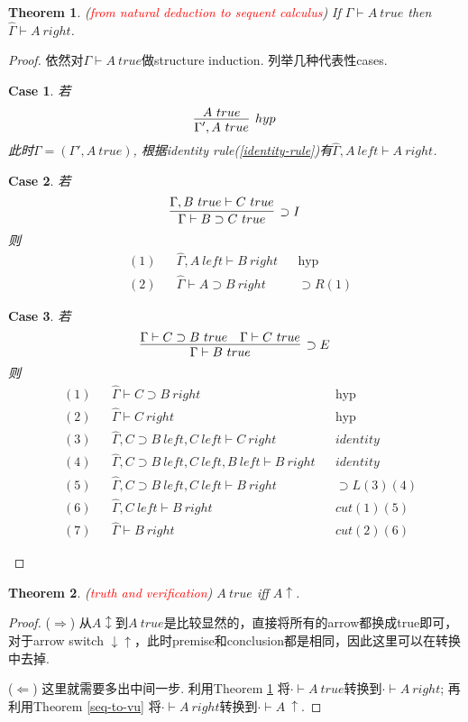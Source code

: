 \documentclass{article}
\theoremstyle{plain}
\newtheorem{theorem}{Theorem}
\newtheorem{case}{Case}
\theoremstyle{nonumberplain}
\newtheorem{proof}{Proof}
\newcommand{\redt}[1]{\textcolor{red}{#1}}
\begin{document}
\begin{theorem}\label{nd-to-seq}
\rm (\redt{from natural deduction to sequent calculus}) If $\Gamma \vdash A~true$ then $\widehat{\Gamma} \vdash A~right$.
\end{theorem}

\begin{proof}
\rm 依然对$\Gamma \vdash A~true$做structure induction. 列举几种代表性cases.
\begin{case}若
$$
\infer[hyp]{\Gamma', A~true}{A~true}
$$
此时$\Gamma = (\Gamma', A~true)$, 根据\emph{identity} rule(\ref{identity-rule})有$\widehat{\Gamma}, A~left \vdash A~right$.
\end{case}
\begin{case}若
$$
\infer[\supset I]{\Gamma \vdash B \supset C~true}{\Gamma, B~true \vdash C~true}
$$
则
$$
\begin{aligned}
&(1) && \widehat{\Gamma} ,A~left \vdash B~right  && \text{hyp} \\
&(2) && \widehat{\Gamma}  \vdash A \supset B ~right && \supset R(1)
\end{aligned}
$$
\end{case}
\begin{case}若
$$
\infer[\supset E]{\Gamma \vdash B~true}{\Gamma \vdash C \supset B~true & \Gamma \vdash C ~true}
$$
则
$$
\begin{aligned}
&(1) &&\widehat{\Gamma} \vdash C\supset B~right && \text{hyp} \\
&(2) &&\widehat{\Gamma} \vdash C~right && \text{hyp} \\
&(3) &&\widehat{\Gamma},C \supset B~left, C~left \vdash C~right && identity \\
&(4) &&\widehat{\Gamma},C \supset B~left, C~left, B~left \vdash B~right && identity \\ 
&(5) &&\widehat{\Gamma},C \supset B~left, C~left \vdash B~right && \supset L(3)(4) \\
&(6) &&\widehat{\Gamma}, C~left \vdash B~right && cut (1)(5) \\
&(7) &&\widehat{\Gamma} \vdash B~right && cut(2)(6)
\end{aligned}
$$
\end{case}
\end{proof}

\begin{theorem}
\rm (\redt{truth and verification}) $A~true$ iff $A \uparrow$. 
\end{theorem}

\begin{proof}
\rm ($\Rightarrow$) 从$A \updownarrow$到$A~true$是比较显然的，直接将所有的arrow都换成true即可，对于arrow switch $\downarrow\uparrow$，此时premise和conclusion都是相同，因此这里可以在转换中去掉. 

($\Leftarrow$) 这里就需要多出中间一步. 利用Theorem \ref{nd-to-seq} 将$\cdot\vdash A~true$转换到$\cdot \vdash A~right$; 再利用Theorem \ref{seq-to-vu} 将$\cdot \vdash A~right$转换到$\cdot \vdash A~\uparrow$. 
\end{proof}
\end{document}
